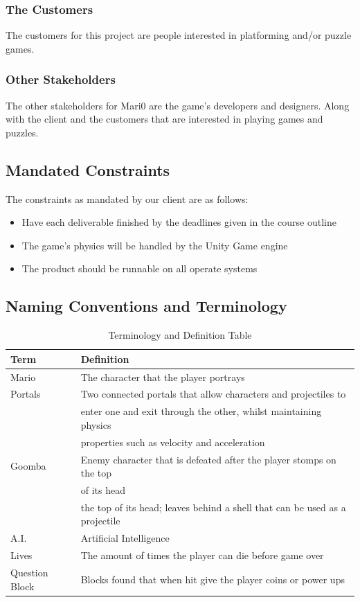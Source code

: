 \documentclass[12pt, titlepage]{article}
\begin{document}
\subsubsection{The Customers}
The customers for this project are people interested in platforming and/or puzzle games.

\subsubsection{Other Stakeholders}
The other stakeholders for Mari0 are the game's developers and designers. Along with the client and the customers that are interested in playing games and puzzles.

\subsection{Mandated Constraints}
The constraints as mandated by our client are as follows:
\begin{itemize}
	\item Have each deliverable finished by the deadlines given in the course outline
	\item The game's physics will be handled by the Unity Game engine
	\item The product should be runnable on all operate systems
\end{itemize}

\subsection{Naming Conventions and Terminology}

\begin{table}
\caption{Terminology and Definition Table}
\begin{tabular}{l l}
\hline
Term			& Definition \\
\hline
Mario      		 & The character that the player portrays  \\
Portals      		 & Two connected portals that allow characters and projectiles to \\
			 & enter one and exit through the other, whilst maintaining physics \\
			 & properties such as velocity and acceleration \\
Goomba		 & Enemy character that is defeated after the player stomps on the top \\
			 & of its head	  \\
			 & the top of its head; leaves behind a shell that can be used as a projectile	\\
A.I.			 & Artificial Intelligence  \\
Lives			 & The amount of times the player can die before game over	\\
Question Block	 & Blocks found that when hit give the player coins or power ups	\\
\hline
\end{tabular}
\end{table}
\end{document}

